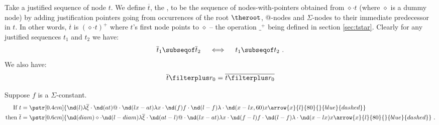 Take a justified sequence of node $t$. We define $\overline{t}$, the ,  
to be the sequence of nodes-with-pointers obtained from $\diamond \cdot t$ (where
$\diamond$ is a dummy node) by adding justification pointers going
from occurrences of the root $\theroot$, @-nodes and $\Sigma$-nodes
to their immediate predecessor in $t$. In other words, $\overline{t}$ is
$(\diamond \cdot t)^+$ where $t$'s first node points to $\diamond$
-- the operation $\_^+$ being defined in section \ref{sec:tstar}.
Clearly for any justified sequences $t_1$ and $t_2$ we have:
\begin{equation}
 \overline{t}_1 \subseqof  \overline{t}_2 \quad \iff \quad t_1 \subseqof  t_2 \label{eqn:hat_subseq} \ .
\end{equation}
We also have:
\begin{equation}
 \overline{t} \filterplus r_0 = \overline{t \filterplus r_0} \label{eqn:hatfilter_eq_filterhat}
\end{equation}

\begin{example} Suppose $f$ is a $\Sigma$-constant.
\begin{align*}
\mbox{If }  t &= \pstr[0.4cm]{ \nd(l){\lambda \overline{\xi}} \cdot \nd(at)@ \cdot \nd(lx-at){\lambda x}\cdot   \nd(f)f \cdot \nd(l-f){\lambda} \cdot \nd(x-lx,60)x
            \arrow{x}{l}{80}{}{blue}{dashed}} \\
\mbox{then }  \overline{t} &= \pstr[0.6cm]{ \nd(diam)\diamond \cdot \nd(l-diam){\lambda \overline{\xi}}
 \cdot  \nd(at-l)@\cdot  \nd(lx-at){\lambda x}\cdot
\nd(f-l)f\cdot \nd(l-f){\lambda}\cdot \nd(x-lx)x
\arrow{x}{l}{80}{}{blue}{dashed}}\ .
\end{align*}
\end{example}


